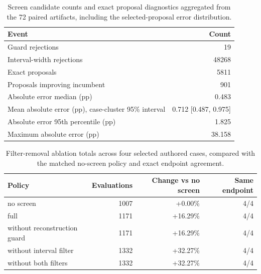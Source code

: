 \begin{table}[htbp]
\centering
\small
\caption{Screen candidate counts and exact proposal diagnostics aggregated from the 72 paired artifacts, including the selected-proposal error distribution.}
\label{tab:screen-events}
\begin{tabular}{lr}
\toprule
Event & Count \\
\midrule
Guard rejections & 19 \\
Interval-width rejections & 48268 \\
Exact proposals & 5811 \\
Proposals improving incumbent & 901 \\
Absolute error median (pp) & 0.483 \\
Mean absolute error (pp), case-cluster 95\% interval & 0.712 [0.487, 0.975] \\
Absolute error 95th percentile (pp) & 1.825 \\
Maximum absolute error (pp) & 38.158 \\
\bottomrule
\end{tabular}
\end{table}

\begin{table}[htbp]
\centering
\small
\caption{Filter-removal ablation totals across four selected authored cases, compared with the matched no-screen policy and exact endpoint agreement.}
\label{tab:guard-summary}
\begin{tabular}{lrrr}
\toprule
Policy & Evaluations & Change vs no screen & Same endpoint \\
\midrule
no screen & 1007 & +0.00\% & 4/4 \\
full & 1171 & +16.29\% & 4/4 \\
without reconstruction guard & 1171 & +16.29\% & 4/4 \\
without interval filter & 1332 & +32.27\% & 4/4 \\
without both filters & 1332 & +32.27\% & 4/4 \\
\bottomrule
\end{tabular}
\end{table}

